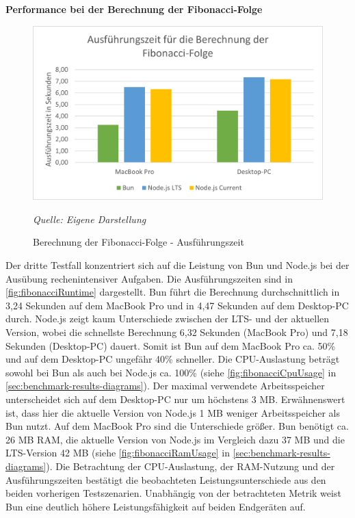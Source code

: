 \noindent
\textbf{Performance bei der Berechnung der Fibonacci-Folge}
\begin{figure}[h!]
	\centering
	\includegraphics[width=\linewidth]{./images/fibonacciRuntime.png}
	\caption{Berechnung der Fibonacci-Folge - Ausführungszeit}
	\label{fig:fibonacciRuntime}
	\textit{Quelle: Eigene Darstellung}
\end{figure}


\noindent
Der dritte Testfall konzentriert sich auf die Leistung von Bun und Node.js bei der Ausübung rechenintensiver Aufgaben. Die Ausführungszeiten sind in \autoref{fig:fibonacciRuntime} dargestellt. Bun führt die Berechnung durchschnittlich in 3,24 Sekunden auf dem MacBook Pro und in 4,47 Sekunden auf dem Desktop-PC durch. Node.js zeigt kaum Unterschiede zwischen der LTS- und der aktuellen Version, wobei die schnellste Berechnung 6,32 Sekunden (MacBook Pro) und 7,18 Sekunden (Desktop-PC) dauert. Somit ist Bun auf dem MacBook Pro ca. 50\% und auf dem Desktop-PC ungefähr 40\% schneller. Die CPU-Auslastung beträgt sowohl bei Bun als auch bei Node.js ca. 100\% (siehe \autoref{fig:fibonacciCpuUsage} in \autoref{sec:benchmark-results-diagrams}). Der maximal verwendete Arbeitsspeicher unterscheidet sich auf dem Desktop-PC nur um höchstens 3 MB. Erwähnenswert ist, dass hier die aktuelle Version von Node.js 1 MB weniger Arbeitsspeicher als Bun nutzt. Auf dem MacBook Pro sind die Unterschiede größer. Bun benötigt ca. 26 MB RAM, die aktuelle Version von Node.js im Vergleich dazu 37 MB und die LTS-Version 42 MB (siehe \autoref{fig:fibonacciRamUsage} in \autoref{sec:benchmark-results-diagrams}).\newline
Die Betrachtung der CPU-Auslastung, der RAM-Nutzung und der Ausführungszeiten bestätigt die beobachteten Leistungsunterschiede aus den beiden vorherigen Testszenarien. Unabhängig von der betrachteten Metrik weist Bun eine deutlich höhere Leistungsfähigkeit auf beiden Endgeräten auf.

